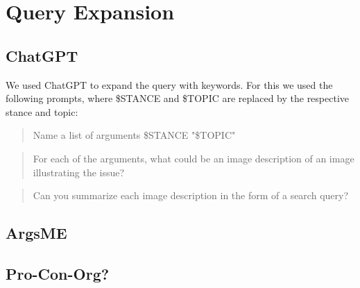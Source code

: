 \section{Query Expansion}

\subsection{ChatGPT}%

We used ChatGPT to expand the query with keywords. For this we used the following prompts, where \$STANCE and \$TOPIC are replaced by the respective stance and topic:

\begin{quote}
    Name a list of arguments \$STANCE "\$TOPIC"
\end{quote}
\begin{quote}
    For each of the arguments, what could be an image description of an image illustrating the issue?
\end{quote}
\begin{quote}
    Can you summarize each image description in the form of a search query?
\end{quote}


\subsection{ArgsME}%
\subsection{Pro-Con-Org?}%